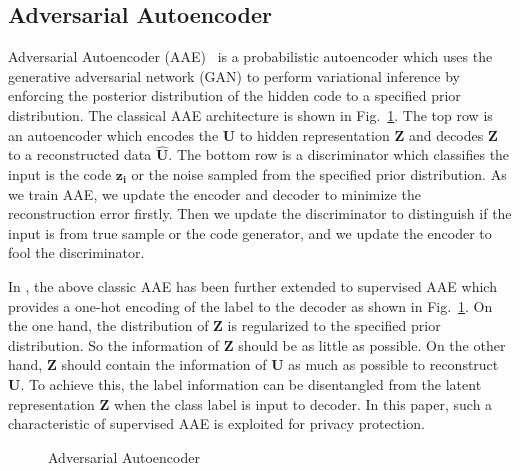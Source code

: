 \documentclass{article}
\begin{document}
\subsection{Adversarial Autoencoder}\label{sec:AAE}
Adversarial Autoencoder (AAE)~\citep{makhzani2015adversarial} is a probabilistic autoencoder which uses the generative adversarial network (GAN) to perform variational inference by enforcing the posterior distribution of the hidden code to a specified  prior distribution. The classical AAE architecture is shown in Fig.~\ref{Fig:AAE}. The top row is an autoencoder which encodes the $\mathbf{U}$ to hidden representation $\mathbf{Z}$ and decodes $\mathbf{Z}$ to a reconstructed data $\mathbf{\hat{U}}$. The bottom row is a discriminator which classifies the input is the code $\mathbf{z_i}$ or the noise sampled from the specified prior distribution. As we train AAE, we update the encoder and decoder to minimize the reconstruction error firstly. Then we update the discriminator to distinguish if the input is from true sample or the code generator, and we update the encoder to fool the discriminator.

In \cite{makhzani2015adversarial}, the above classic AAE has been further extended to supervised AAE which provides a one-hot encoding of the label to the decoder as shown in  Fig.~\ref{Fig:AAE}. On the one hand, the distribution of $\mathbf{Z}$ is regularized to the specified  prior distribution. So the information of $\mathbf{Z}$ should be as little as possible. On the other hand, $\mathbf{Z}$ should contain the information of $\mathbf{U}$ as much as possible to reconstruct $\mathbf{U}$. To achieve this, the label information can be disentangled from the latent representation $\mathbf{Z}$ when the class label is input to decoder. In this paper, such a characteristic of supervised AAE is exploited for privacy protection.
\begin{figure}[!ht]
\vspace{-15pt}
     \hfill
     \caption{Adversarial Autoencoder}
     \label{Fig:AAE}
   \end{figure}
\end{document}
